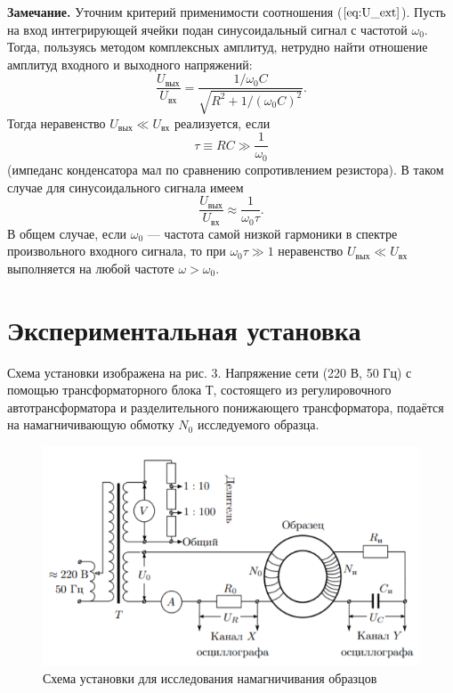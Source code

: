 \documentclass[a4paper,12pt]{article} %
\begin{document}
\textbf{Замечание.} Уточним критерий применимости соотношения ($\ref{eq:U_ext}$). Пусть на вход интегрирующей ячейки подан синусоидальный сигнал с частотой $\omega_0$. Тогда, пользуясь методом комплексных амплитуд, нетрудно найти отношение амплитуд входного и выходного напряжений:
\begin{equation}
  \frac{U_{\text{вых}}}{U_{\text{вх}}}=\frac{1/\omega_0C}{\sqrt{R^2+1/(\omega_0C)^2}}.
\end{equation}
Тогда неравенство $U_{\text{вых}} \ll U_{\text{вх}}$ реализуется, если 
\begin{equation}
  \tau \equiv RC\gg \frac{1}{\omega_0}
\end{equation}
(импеданс конденсатора мал по сравнению сопротивлением резистора).
В таком случае для синусоидального сигнала имеем
\begin{equation}
  \frac{U_{\text{вых}}}{U_{\text{вх}}}\approx\frac{1}{\omega_0\tau}.
\end{equation}
В общем случае, если $\omega_0$ — частота самой низкой гармоники в спектре
произвольного входного сигнала, то при $\omega_0\tau \gg 1$ неравенство $U_{\text{вых}} \ll U_{\text{вх}}$ выполняется на любой частоте $\omega > \omega_0$.

\section{Экспериментальная установка}

Схема установки изображена на рис. 3. Напряжение сети (220 В,
50 Гц) с помощью трансформаторного блока Т, состоящего из регулировочного автотрансформатора и разделительного понижающего трансформатора, подаётся на намагничивающую обмотку $N_0$ исследуемого образца.
\begin{figure}[h!]
  \centering
  \includegraphics{scheme.png}
  \caption{ Схема установки для исследования намагничивания образцов}
  \label{fig:scheme}
\end{figure}
\end{document}

